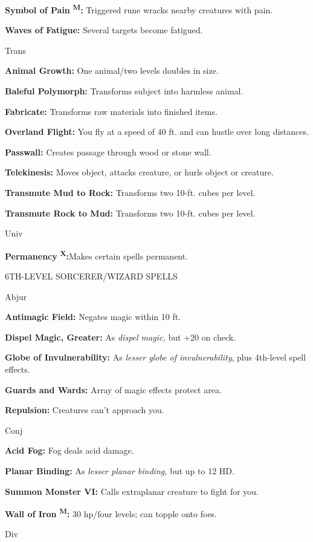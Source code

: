 \documentclass{article}
\begin{document}
\textbf{Symbol of Pain }\textsuperscript{\textbf{M}}\textbf{:} Triggered rune wracks 
nearby creatures with pain.

\textbf{Waves of Fatigue:} Several targets become fatigued.

Trans

\textbf{Animal Growth:} One animal/two levels doubles in size.

\textbf{Baleful Polymorph:} Transforms subject into harmless animal.

\textbf{Fabricate:} Transforms raw materials into finished items.

\textbf{Overland Flight:} You fly at a speed of 40 ft. and can hustle over long 
distances.

\textbf{Passwall:} Creates passage through wood or stone wall.

\textbf{Telekinesis:} Moves object, attacks creature, or hurls object or creature.

\textbf{Transmute Mud to Rock:} Transforms two 10-ft. cubes per level.

\textbf{Transmute Rock to Mud:} Transforms two 10-ft. cubes per level.

Univ

\textbf{Permanency }\textsuperscript{\textbf{X}}\textbf{:}Makes certain spells 
permanent.

6TH-LEVEL SORCERER/WIZARD SPELLS

Abjur

\textbf{Antimagic Field:} Negates magic within 10 ft.

\textbf{Dispel Magic, Greater:} As \textit{dispel magic, }but +20 on check.

\textbf{Globe of Invulnerability:} As \textit{lesser globe of invulnerability}, 
plus 4th-level spell effects.

\textbf{Guards and Wards:} Array of magic effects protect area.

\textbf{Repulsion:} Creatures can't approach you.

Conj

\textbf{Acid Fog:} Fog deals acid damage.

\textbf{Planar Binding:} As \textit{lesser planar binding, }but up to 12 HD.

\textbf{Summon Monster VI:} Calls extraplanar creature to fight for you.

\textbf{Wall of Iron }\textsuperscript{\textbf{M}}\textbf{:} 30 hp/four levels; 
can topple onto foes.

Div
\end{document}
